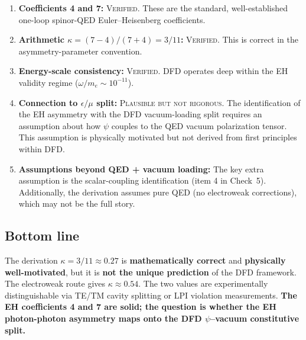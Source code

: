 \documentclass[12pt]{article}
\begin{document}
\begin{enumerate}
\item \textbf{Coefficients 4 and 7:} \textsc{Verified}.  These are
  the standard, well-established one-loop spinor-QED
  Euler--Heisenberg coefficients.

\item \textbf{Arithmetic $\kappa = (7-4)/(7+4) = 3/11$:}
  \textsc{Verified}.  This is correct in the asymmetry-parameter
  convention.

\item \textbf{Energy-scale consistency:}  \textsc{Verified}.  DFD
  operates deep within the EH validity regime ($\omega/m_e \sim
  10^{-11}$).

\item \textbf{Connection to $\epsilon/\mu$ split:}
  \textsc{Plausible but not rigorous}.  The identification of the EH
  asymmetry with the DFD vacuum-loading split requires an assumption
  about how $\psi$ couples to the QED vacuum polarization tensor.
  This assumption is physically motivated but not derived from first
  principles within DFD.

\item \textbf{Assumptions beyond QED + vacuum loading:}  The key
  extra assumption is the scalar-coupling identification (item 4 in
  Check~5).  Additionally, the derivation assumes pure QED (no
  electroweak corrections), which may not be the full story.
\end{enumerate}

\subsection*{Bottom line}

The derivation $\kappa = 3/11 \approx 0.27$ is
\textbf{mathematically correct} and \textbf{physically well-motivated},
but it is \textbf{not the unique prediction} of the DFD framework.
The electroweak route gives $\kappa \approx 0.54$.  The two values
are experimentally distinguishable via TE/TM cavity splitting or
LPI violation measurements.  \textbf{The EH coefficients 4 and 7 are
solid; the question is whether the EH photon-photon asymmetry maps
onto the DFD $\psi$--vacuum constitutive split.}
\end{document}
